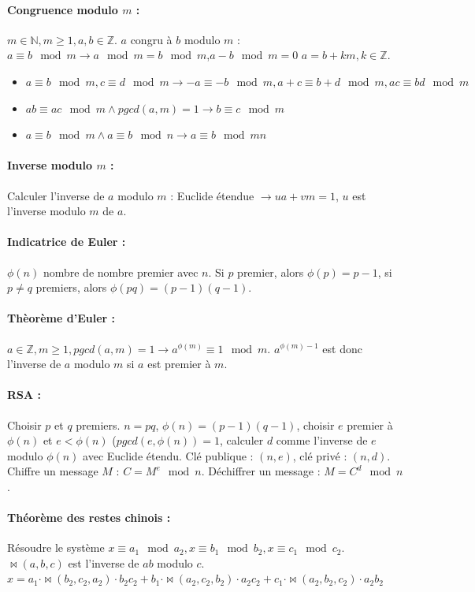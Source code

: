 \documentclass[11pt,a4paper]{report}
\begin{document}
\paragraph*{Congruence modulo $m$ :} $m\in \mathbb{N}, m \geq 1,{a,b}\in \mathbb{Z}$. $a$ congru à $b$ modulo $m$ : $a\equiv b \mod m \rightarrow a\mod m = b\mod m$,$a-b\mod m = 0$ $a=b+km,k\in \mathbb{Z}$. 
\begin{itemize}
    \item $a\equiv b \mod m,c\equiv d \mod m \rightarrow -a \equiv -b \mod m, a+c \equiv b+d \mod m, ac \equiv bd \mod m$
    \item $ab \equiv ac \mod m \wedge pgcd(a,m)=1 \rightarrow b \equiv c \mod m$
    \item $a \equiv b \mod m \wedge a \equiv b \mod n \rightarrow a \equiv b \mod mn$
\end{itemize}

\paragraph*{Inverse modulo $m$ :} Calculer l'inverse de $a$ modulo $m$ : Euclide étendue $\rightarrow ua+vm=1$, $u$ est l'inverse modulo $m$ de $a$.

\paragraph*{Indicatrice de Euler :} $\phi(n)$ nombre de nombre premier avec $n$. Si $p$ premier, alors $\phi(p)=p-1$, si $p\neq q$ premiers, alors $\phi(pq)=(p-1)(q-1)$.

\paragraph*{Thèorème d'Euler :} $a\in\mathbb{Z},m\geq1,pgcd(a,m)=1 \rightarrow a^{\phi(m)} \equiv 1 \mod m$. $a^{\phi(m)-1}$ est donc l'inverse de $a$ modulo $m$ si $a$ est premier à $m$.

\paragraph*{RSA :} Choisir $p$ et $q$ premiers. $n=pq$, $\phi(n)=(p-1)(q-1)$, choisir $e$ premier à $\phi(n)$ et $e<\phi(n)$ ($pgcd(e,\phi(n))=1$, calculer $d$ comme l'inverse de $e$ modulo $\phi(n)$ avec Euclide étendu. Clé publique : $(n,e)$, clé privé : $(n,d)$. Chiffre un message $M$ : $C = M^e \mod n$. Déchiffrer un message : $M = C^d\mod n$.

\paragraph*{Théorème des restes chinois :} Résoudre le système $x \equiv a_1 \mod a_2, x \equiv b_1 \mod b_2, x \equiv c_1 \mod c_2$. $\bowtie(a,b,c)$ est l'inverse de $ab$ modulo $c$. $x = a_1 \cdot \bowtie(b_2,c_2,a_2) \cdot b_2c_2 + b_1 \cdot \bowtie(a_2,c_2,b_2) \cdot a_2c_2 + c_1 \cdot \bowtie(a_2,b_2,c_2) \cdot a_2b_2$
\end{document}
